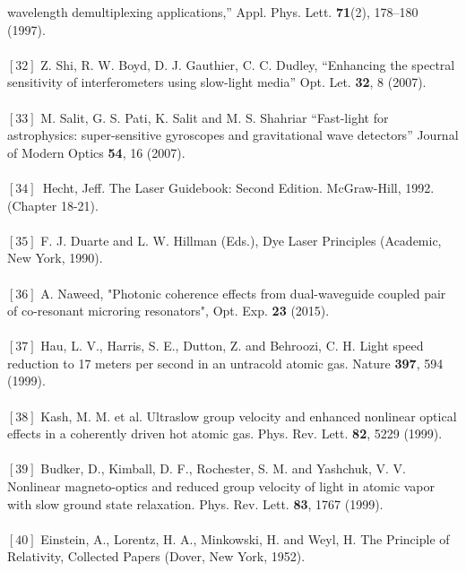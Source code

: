 {wavelength demultiplexing applications,” Appl. Phys. Lett. \textbf{71}(2), 178–180 (1997).\\
\\ $[32]$  Z. Shi, R. W. Boyd, D. J. Gauthier, C. C. Dudley, “Enhancing the spectral sensitivity of interferometers
using slow-light media” Opt. Let. \textbf{32}, 8 (2007).\\
\\ $[33]$  M. Salit, G. S. Pati, K. Salit and M. S. Shahriar “Fast-light for astrophysics: super-sensitive gyroscopes and gravitational wave detectors” Journal of Modern Optics \textbf{54}, 16 (2007).\\
\\ $[34]$\,  Hecht, Jeff. The Laser Guidebook: Second Edition. McGraw-Hill, 1992. (Chapter 18-21).\\
\\ $[35]$  F. J. Duarte and L. W. Hillman (Eds.), Dye Laser Principles (Academic, New York, 1990).\\
\\ $[36]$ A. Naweed, "Photonic coherence effects from dual-waveguide coupled pair of co-resonant microring resonators", Opt. Exp. \textbf{23} (2015).\\
\\ $[37]$ Hau, L. V., Harris, S. E., Dutton, Z. and Behroozi, C. H. Light speed reduction to 17 meters per second in
an untracold atomic gas. Nature \textbf{397}, 594 (1999).\\
\\ $[38]$  Kash, M. M. et al. Ultraslow group velocity and enhanced nonlinear optical effects in a coherently
driven hot atomic gas. Phys. Rev. Lett. \textbf{82}, 5229 (1999).\\
\\ $[39]$ Budker, D., Kimball, D. F., Rochester, S. M. and Yashchuk, V. V. Nonlinear magneto-optics and reduced
group velocity of light in atomic vapor with slow ground state relaxation. Phys. Rev. Lett. \textbf{83}, 1767 (1999).\\
\\ $[40]$ Einstein, A., Lorentz, H. A., Minkowski, H. and Weyl, H. The Principle of Relativity, Collected Papers
(Dover, New York, 1952).}


